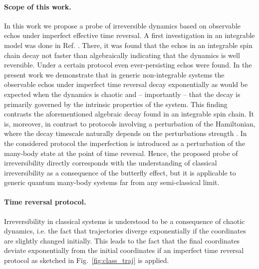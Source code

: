 \documentclass[%
 reprint,
unsortedaddress,
 amsmath,amssymb,
 prl,
]{revtex4-1}
\begin{document}
\paragraph{Scope of this work.}
In this work we propose a probe of irreversible dynamics based on observable echos under imperfect
effective time reversal. A first investigation in an integrable model was done in Ref. \cite{Schmitt2016}.
There, it was found that the echos in an integrable spin chain decay not faster than algebraically
indicating that the dynamics is well reversible. Under a certain protocol even ever-persisting echos were
found.
In the present work we demonstrate that in generic non-integrable systems 
the observable echos under imperfect time reversal decay
exponentially as would be expected when the dynamics is chaotic and -- importantly -- that the decay is 
primarily governed by the intrinsic properties of the system. This finding contrasts the 
aforementioned algebraic decay found in an integrable spin chain.
It is, moreover, in contrast to protocols involving a perturbation of the Hamiltonian, where the decay timescale naturally depends on the perturbations strength \cite{Zangara2015,SchmittThesis2018}.
In the considered protocol the imperfection is introduced as a perturbation of the
many-body state at the point of time reversal. Hence, the proposed probe of irreversibility 
directly corresponds with 
the understanding of classical irreversibility as a consequence of the
butterfly effect, but it is applicable to generic quantum many-body systems far from any semi-classical
limit.

\paragraph{Time reversal protocol.}
Irreversibility in classical systems is understood to be a consequence of chaotic dynamics,
i.e. the fact that trajectories diverge exponentially if the coordinates are slightly changed initially.
This leads to the fact that the final coordinates deviate exponentially from the initial coordinates
if an imperfect time reversal protocol as sketched in Fig.\ \ref{fig:class_traj} is applied.
\end{document}
